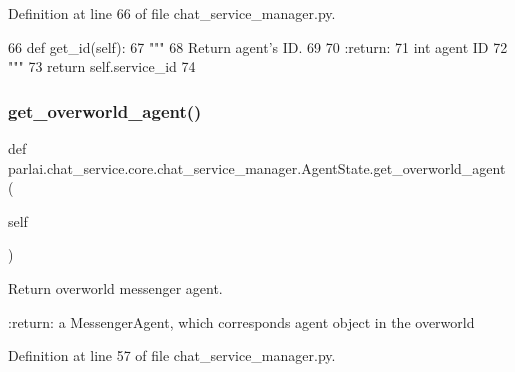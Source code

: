 Definition at line 66 of file chat\+\_\+service\+\_\+manager.\+py.


\begin{DoxyCode}
66     \textcolor{keyword}{def }get\_id(self):
67         \textcolor{stringliteral}{"""}
68 \textcolor{stringliteral}{        Return agent's ID.}
69 \textcolor{stringliteral}{}
70 \textcolor{stringliteral}{        :return:}
71 \textcolor{stringliteral}{            int agent ID}
72 \textcolor{stringliteral}{        """}
73         \textcolor{keywordflow}{return} self.service\_id
74 
\end{DoxyCode}
\mbox{\label{classparlai_1_1chat__service_1_1core_1_1chat__service__manager_1_1AgentState_a70c633ce420183c76f5965fe9a638be4}} 
\subsubsection{\texorpdfstring{get\+\_\+overworld\+\_\+agent()}{get\_overworld\_agent()}}
{\footnotesize\ttfamily def parlai.\+chat\+\_\+service.\+core.\+chat\+\_\+service\+\_\+manager.\+Agent\+State.\+get\+\_\+overworld\+\_\+agent (\begin{DoxyParamCaption}\item[{}]{self }\end{DoxyParamCaption})}

\begin{DoxyVerb}Return overworld messenger agent.

:return:
    a MessengerAgent, which corresponds agent object in the overworld
\end{DoxyVerb}
 

Definition at line 57 of file chat\+\_\+service\+\_\+manager.\+py.


